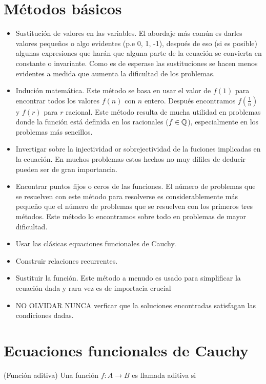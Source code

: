 \section{\large Métodos básicos}
{
    \begin{itemize}
        \item Sustitución de valores en las variables. El abordaje más común es darles valores pequeños o algo evidentes (p.e 0, 1, -1), después de eso (si es posible) algunas expresiones que harán que alguna parte de la ecuación se convierta en constante o invariante. Como es de esperase las sustituciones se hacen menos evidentes a medida que aumenta la dificultad de los problemas.
        \item Indución matemática. Este método se basa en usar el valor de $f(1)$ para encontrar todos los valores $f(n)$ con $n$ entero. Después encontramos $f(\frac{1}{n})$ y $f(r)$ para $r$ racional. Este método resulta de mucha utilidad en problemas donde la función está definida en los racionales ($f \in \mathbb{Q}$), especialmente en los problemas más sencillos.
        \item Invertigar sobre la injectividad or sobrejectividad de la fuciones implicadas en la ecuación. En muchos problemas estos hechos no muy dífiles de deducir pueden ser de gran importancia.
        \item Encontrar puntos fijos o ceros de las funciones. El número de problemas que se resuelven con este método para resolverse es considerablemente más pequeño que el número de problemas que se resuelven con los primeros tres métodos. Este método lo encontramos sobre todo en problemas de mayor dificultad.
        \item Usar las clásicas equaciones funcionales de Cauchy.
        \item Construir relaciones recurrentes.
        \item Sustituir la función. Este método a menudo es usado para simplificar la ecuación dada y rara vez es de importacia crucial
        \item NO OLVIDAR NUNCA verficar que la soluciones encontradas satisfagan las condiciones dadas.
    \end{itemize}
}

\section{\large Ecuaciones funcionales de Cauchy}
{
    \begin{definition}
    (Función aditiva) Una función $f: A \rightarrow B$ es llamada aditiva si
    \end{definition}
}